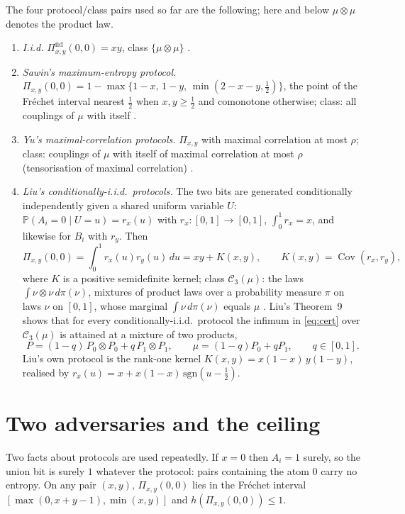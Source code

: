 \documentclass[11pt,a4paper]{article}
\theoremstyle{definition}
\theoremstyle{remark}
\newcommand{\Prob}{\mathbb{P}}
\newcommand{\cC}{\mathcal{C}}
\newcommand{\ent}{h}
\newcommand{\iid}{\mathrm{iid}}
\DeclareMathOperator{\Cov}{Cov}
\begin{document}
The four protocol/class pairs used so far are the following; here and below $\mu\otimes\mu$ denotes the product law.
\begin{enumerate}
\item \emph{I.i.d.} $\Pi^{\iid}_{x,y}(0,0)=xy$, class $\{\mu\otimes\mu\}$ \cite{Gilmer}.
\item \emph{Sawin's maximum-entropy protocol.} $\Pi_{x,y}(0,0)=1-\max\{1-x,\,1-y,\,\min(2-x-y,\tfrac12)\}$, the point of the Fr\'echet interval nearest $\frac12$ when $x,y\ge\frac12$ and comonotone otherwise; class: all couplings of $\mu$ with itself \cite{Sawin,Yu,Cambie}.
\item \emph{Yu's maximal-correlation protocols.} $\Pi_{x,y}$ with maximal correlation at most $\rho$; class: couplings of $\mu$ with itself of maximal correlation at most $\rho$ (tensorisation of maximal correlation) \cite{Yu}.
\item \emph{Liu's conditionally-i.i.d.\ protocols.} The two bits are generated conditionally independently given a shared uniform variable $U$: $\Prob(A_i=0\mid U=u)=r_x(u)$ with $r_x:[0,1]\to[0,1]$, $\int_0^1r_x=x$, and likewise for $B_i$ with $r_y$. Then
\begin{equation}\label{eq:kernel}
\Pi_{x,y}(0,0)=\int_0^1r_x(u)r_y(u)\,du=xy+K(x,y),\qquad K(x,y)=\Cov(r_x,r_y),
\end{equation}
where $K$ is a positive semidefinite kernel; class $\cC_3(\mu)$: the laws $\int\nu\otimes\nu\,d\pi(\nu)$, mixtures of product laws over a probability measure $\pi$ on laws $\nu$ on $[0,1]$, whose marginal $\int\nu\,d\pi(\nu)$ equals $\mu$ \cite{Liu}. Liu's Theorem~9 shows that for every conditionally-i.i.d.\ protocol the infimum in \eqref{eq:cert} over $\cC_3(\mu)$ is attained at a mixture of two products,
\begin{equation}\label{eq:twoprod}
P=(1-q)\,P_0\otimes P_0+q\,P_1\otimes P_1,\qquad\mu=(1-q)P_0+qP_1,\qquad q\in[0,1].
\end{equation}
Liu's own protocol is the rank-one kernel $K(x,y)=x(1-x)\,y(1-y)$, realised by $r_x(u)=x+x(1-x)\,\mathrm{sgn}(u-\tfrac12)$.
\end{enumerate}

\section{Two adversaries and the ceiling}\label{sec:ceiling}
Two facts about protocols are used repeatedly. If $x=0$ then $A_i=1$ surely, so the union bit is surely $1$ whatever the protocol: pairs containing the atom $0$ carry no entropy. On any pair $(x,y)$, $\Pi_{x,y}(0,0)$ lies in the Fr\'echet interval $[\max(0,x+y-1),\min(x,y)]$ and $\ent(\Pi_{x,y}(0,0))\le1$.
\end{document}
